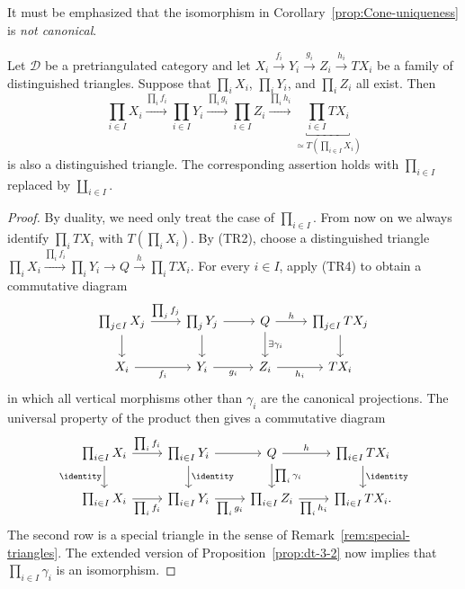 It must be emphasized that the isomorphism in
Corollary~\ref{prop:Cone-uniqueness} is \emph{not canonical}.

\begin{lemma}\label{prop:dt-sum}
	Let $\mathcal{D}$ be a pretriangulated category and let
	$X_i \xrightarrow{f_i} Y_i \xrightarrow{g_i} Z_i \xrightarrow{h_i} TX_i$
	be a family of distinguished triangles. Suppose that
	$\prod_i X_i$, $\prod_i Y_i$, and $\prod_i Z_i$ all exist. Then
	\[ \prod_{i \in I} X_i \xrightarrow{\prod_i f_i } \prod_{i \in I} Y_i \xrightarrow{\prod_i g_i} \prod_{i \in I} Z_i \xrightarrow{\prod_i h_i} \underbracket{\prod_{i \in I} TX_i}_{\simeq T(\prod_{i \in I} X_i)} \]
	is also a distinguished triangle. The corresponding assertion holds with
	$\prod_{i \in I}$ replaced by $\coprod_{i \in I}$.
\end{lemma}

\begin{proof}
	By duality, we need only treat the case of $\prod_{i \in I}$. From now on
	we always identify $\prod_i TX_i$ with $T(\prod_i X_i)$. By (TR2), choose
	a distinguished triangle
	$\prod_i X_i \xrightarrow{\prod_i f_i} \prod_i Y_i \to Q
	\xrightarrow{h} \prod_i TX_i$. For every $i \in I$, apply (TR4) to
	obtain a commutative diagram
	\[\begin{tikzcd}
		\prod_{j \in I} X_j \arrow[r, "{\prod_j f_j}"] \arrow[d] & \prod_j Y_j \arrow[r] \arrow[d] & Q \arrow[r, "h"] \arrow[d, "{\exists \gamma_i}"] & \prod_{j \in I} TX_j \arrow[d] \\
		X_i \arrow[r, "{f_i}"'] & Y_i \arrow[r, "{g_i}"'] & Z_i \arrow[r, "{h_i}"'] & TX_i
	\end{tikzcd}\]
	in which all vertical morphisms other than $\gamma_i$ are the canonical
	projections. The universal property of the product then gives a
	commutative diagram
	\[\begin{tikzcd}
		\prod_{i \in I} X_i \arrow[r, "{\prod_i f_i}"] \arrow[d, "\identity"'] & \prod_{i \in I} Y_i \arrow[r] \arrow[d, "\identity"] & Q \arrow[r, "h"] \arrow[d, "{\prod_i \gamma_i}"] & \prod_{i \in I} TX_i \arrow[d, "\identity"] \\
		\prod_{i \in I} X_i \arrow[r, "{\prod_i f_i}"'] & \prod_{i \in I} Y_i \arrow[r, "{\prod_i g_i}"'] & \prod_{i \in I} Z_i \arrow[r, "{\prod_i h_i}"'] & \prod_{i \in I} TX_i .
	\end{tikzcd}\]
	The second row is a special triangle in the sense of
	Remark~\ref{rem:special-triangles}. The extended version of
	Proposition~\ref{prop:dt-3-2} now implies that
	$\prod_{i \in I} \gamma_i$ is an isomorphism.
\end{proof}


